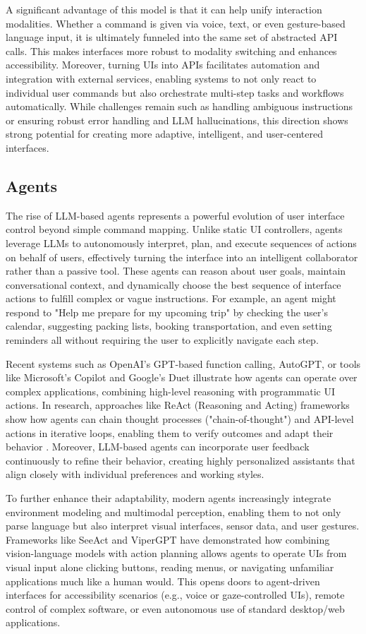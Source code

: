 \documentclass[openany]{book}
\begin{document}
A significant advantage of this model is that it can help unify interaction modalities. Whether a command is given via voice, text, or even gesture-based language input, it is ultimately funneled into the same set of abstracted API calls. This makes interfaces more robust to modality switching and enhances accessibility.
Moreover, turning UIs into APIs facilitates automation and integration with external services, enabling systems to not only react to individual user commands but also orchestrate multi-step tasks and workflows automatically. While challenges remain such as handling ambiguous instructions or ensuring robust error handling and LLM hallucinations, this direction shows strong potential for creating more adaptive, intelligent, and user-centered interfaces.

\subsection{Agents}
The rise of LLM-based agents represents a powerful evolution of user interface control beyond simple command mapping. Unlike static UI controllers, agents leverage LLMs to autonomously interpret, plan, and execute sequences of actions on behalf of users, effectively turning the interface into an intelligent collaborator rather than a passive tool.
These agents can reason about user goals, maintain conversational context, and dynamically choose the best sequence of interface actions to fulfill complex or vague instructions. For example, an agent might respond to "Help me prepare for my upcoming trip" by checking the user's calendar, suggesting packing lists, booking transportation, and even setting reminders all without requiring the user to explicitly navigate each step.

Recent systems such as OpenAI’s GPT-based function calling, AutoGPT, or tools like Microsoft’s Copilot and Google’s Duet illustrate how agents can operate over complex applications, combining high-level reasoning with programmatic UI actions. In research, approaches like ReAct (Reasoning and Acting) frameworks show how agents can chain thought processes ("chain-of-thought") and API-level actions in iterative loops, enabling them to verify outcomes and adapt their behavior \cite{yao2022react}. Moreover, LLM-based agents can incorporate user feedback continuously to refine their behavior, creating highly personalized assistants that align closely with individual preferences and working styles.

To further enhance their adaptability, modern agents increasingly integrate environment modeling and multimodal perception, enabling them to not only parse language but also interpret visual interfaces, sensor data, and user gestures. Frameworks like SeeAct and ViperGPT have demonstrated how combining vision-language models with action planning allows agents to operate UIs from visual input alone clicking buttons, reading menus, or navigating unfamiliar applications much like a human would. This opens doors to agent-driven interfaces for accessibility scenarios (e.g., voice or gaze-controlled UIs), remote control of complex software, or even autonomous use of standard desktop/web applications. 
\end{document}
